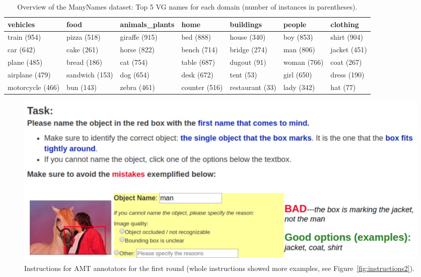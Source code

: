 \begin{table}[htp]
	\small
	\centering
	\begin{tabular}{@{~}l@{~}l@{~}l@{~}l@{~}l@{~}l@{~}l}
		\toprule
		vehicles &            food & animals\_plants &           home &        buildings &             people &      clothing \\
		\midrule
		train (954) &  pizza (518) &  giraffe (915) &  bed (888) &  house (340) &  boy (853) &  shirt (904) \\
		car (642) &  cake (261) &  horse (822) &  bench (714) &  bridge (274) &  man (806) &  jacket (451) \\
		plane (485) &  bread (186) &  cat (754) &  table (687) &  dugout (91) &  woman (766) &  coat (267) \\
		airplane (479) &  sandwich (153) &  dog (654) &  desk (672) &  tent (53) &  girl (650) &  dress (190) \\
		motorcycle (466) &  bun (143) &  zebra (461) &  counter (516) &  restaurant (33) &  lady (342) &  hat (77) \\
		\bottomrule
	\end{tabular}
	\caption{Overview of the ManyNames dataset: Top 5 VG names for each domain (number of instances in parentheses).\label{tab:overview_dataset1}}
\end{table}

\begin{figure}[htp]
  \centering
  \includegraphics[width=1.5\columnwidth]{figures/round0_cropped.png}
  \caption{Instructions for AMT annotators for the first round (whole instructions showed more examples, see Figure~\ref{fig:instructions2}).}
  \label{fig:instructions1}
\end{figure}

